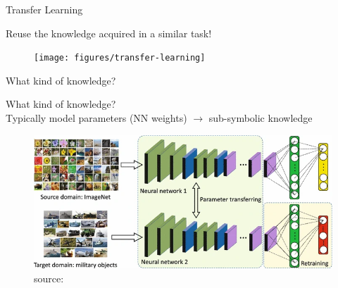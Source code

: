 \documentclass[presentation]{beamer}\mode<presentation>{\usetheme{blackAMSBolognaFC}}
\begin{document}
\begin{frame}[allowframebreaks]{Transfer Learning}

    \centering
    Reuse the knowledge acquired in a \alert{similar} task!~

    \framebreak

    \begin{figure}
        \texttt{[image: figures/transfer-learning]}
    \end{figure}

    \framebreak

    \centering
    What kind of knowledge?
    \vspace{0.5cm}

    \framebreak

    \centering
    What kind of knowledge?
    \\
    \vspace{0.5cm}
    Typically model parameters (NN weights) $\rightarrow$ \alert{sub-symbolic} knowledge

    \framebreak

    \centering
    \begin{figure}
        \includegraphics[width=0.7\linewidth]{figures/deep-transfer-learning-example}
        \caption{source: }
    \end{figure}

\end{frame}
\end{document}
